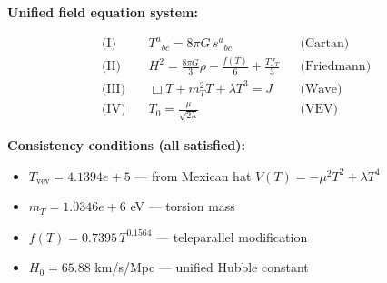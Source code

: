 
\textbf{Unified field equation system:}

\begin{align}
  \text{(I)} \quad & T^a{}_{bc} = 8\pi G \, s^a{}_{bc} && \text{(Cartan)} \\
  \text{(II)} \quad & H^2 = \frac{8\pi G}{3}\rho - \frac{f(T)}{6} + \frac{Tf_T}{3} && \text{(Friedmann)} \\
  \text{(III)} \quad & \Box T + m_T^2 T + \lambda T^3 = J && \text{(Wave)} \\
  \text{(IV)} \quad & T_0 = \frac{\mu}{\sqrt{2\lambda}} && \text{(VEV)}
\end{align}

\textbf{Consistency conditions (all satisfied):}
\begin{itemize}
  \item $T_{\text{vev}} = 4.1394e+5$ — from Mexican hat $V(T) = -\mu^2 T^2 + \lambda T^4$
  \item $m_T = 1.0346e+6$ eV — torsion mass
  \item $f(T) = 0.7395 \, T^{0.1564}$ — teleparallel modification
  \item $H_0 = 65.88$ km/s/Mpc — unified Hubble constant
\end{itemize}